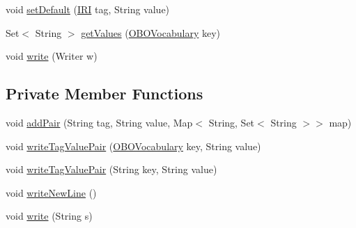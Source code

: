 \begin{DoxyCompactItemize}
\item 
void \hyperlink{classorg_1_1coode_1_1owlapi_1_1obo_1_1renderer_1_1_o_b_o_tag_value_pair_list_a5e38e59164bcbcc8afd1504d56cacbde}{set\-Default} (\hyperlink{classorg_1_1semanticweb_1_1owlapi_1_1model_1_1_i_r_i}{I\-R\-I} tag, String value)
\item 
Set$<$ String $>$ \hyperlink{classorg_1_1coode_1_1owlapi_1_1obo_1_1renderer_1_1_o_b_o_tag_value_pair_list_aab13718c422956267c55675ff00db813}{get\-Values} (\hyperlink{enumorg_1_1coode_1_1owlapi_1_1obo_1_1parser_1_1_o_b_o_vocabulary}{O\-B\-O\-Vocabulary} key)
\item 
void \hyperlink{classorg_1_1coode_1_1owlapi_1_1obo_1_1renderer_1_1_o_b_o_tag_value_pair_list_a357cbde6748f27ab4638dd0e6671c1b9}{write} (Writer w)
\end{DoxyCompactItemize}
\subsection*{Private Member Functions}
\begin{DoxyCompactItemize}
\item 
void \hyperlink{classorg_1_1coode_1_1owlapi_1_1obo_1_1renderer_1_1_o_b_o_tag_value_pair_list_a894776b21cbb9bc73e8f8b66c6f8893b}{add\-Pair} (String tag, String value, Map$<$ String, Set$<$ String $>$$>$ map)
\item 
void \hyperlink{classorg_1_1coode_1_1owlapi_1_1obo_1_1renderer_1_1_o_b_o_tag_value_pair_list_a22eaec40c296fc8c455728dfaa92a9e8}{write\-Tag\-Value\-Pair} (\hyperlink{enumorg_1_1coode_1_1owlapi_1_1obo_1_1parser_1_1_o_b_o_vocabulary}{O\-B\-O\-Vocabulary} key, String value)
\item 
void \hyperlink{classorg_1_1coode_1_1owlapi_1_1obo_1_1renderer_1_1_o_b_o_tag_value_pair_list_a4a07a3837cf00b6bb5616e05c9b8cf54}{write\-Tag\-Value\-Pair} (String key, String value)
\item 
void \hyperlink{classorg_1_1coode_1_1owlapi_1_1obo_1_1renderer_1_1_o_b_o_tag_value_pair_list_a66dac753c5effb90b81d1471ff878fce}{write\-New\-Line} ()
\item 
void \hyperlink{classorg_1_1coode_1_1owlapi_1_1obo_1_1renderer_1_1_o_b_o_tag_value_pair_list_a9669be2237f6e6a4d1f3b74f3d7f9ad1}{write} (String s)
\end{DoxyCompactItemize}
